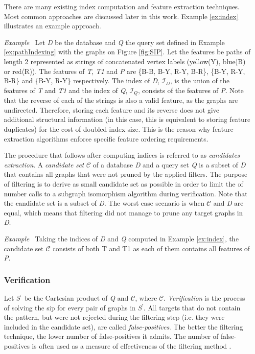 \documentclass{l4proj}
\newcounter{example}[section]
\newenvironment{example}[1][]{\refstepcounter{example}\par\medskip
   \noindent \textit{Example~\theexample #1} \rmfamily}{\medskip}
\newcommand{\fancyI}{\mathcal{I}}
\newcommand{\fancyC}{\mathcal{C}}
\begin{document}
There are many existing index computation and feature extraction techniques. Most common approaches are discussed later in this work. Example \ref{ex:index} illustrates an example approach.

\begin{example}
\label{ex:index}
Let \emph{D} be the database and \emph{Q} the query set defined in Example \ref{ex:pathIndexing} with the graphs on Figure \ref{fig:SIP}. Let the features be paths of length 2 represented as strings of concatenated vertex labels (yellow(Y), blue(B) or red(R)). The features of \emph{T}, \emph{T1} and \emph{P} are \{B-B, B-Y, R-Y, B-R\}, \{B-Y, R-Y, B-R\} and \{B-Y, R-Y\} respectively. The index of \emph{D}, $\fancyI_{D}$, is the union of the features of \emph{T} and \emph{T1} and the index of \emph{Q}, $\fancyI_{Q}$, consists of the features of \emph{P}. Note that the reverse of each of the strings is also a valid feature, as the graphs are undirected. Therefore, storing each feature and its reverse does not give additional structural information (in this case, this is equivalent to storing feature duplicates) for the cost of doubled index size. This is the reason why feature extraction algorithms enforce specific feature ordering requirements.
\end{example}

The procedure that follows after computing indices is referred to as \emph{candidates extraction}. A \emph{candidate set} $\fancyC$ of a database \emph{D} and a query set \emph{Q} is a subset of \emph{D} that contains all graphs that were not pruned by the applied filters. 
The purpose of filtering is to derive as small candidate set as possible in order to limit the of number calls to a subgraph isomorphism algorithm during verification. Note that the candidate set is a subset of \emph{D}. The worst case scenario is when $\fancyC$ and \emph{D} are equal, which means that filtering did not manage to prune any target graphs in \emph{D}.

\begin{example}
Taking the indices of \emph{D} and \emph{Q} computed in Example \ref{ex:index}, the candidate set $\fancyC$ consists of both T and T1 as each of them contains all features of \emph{P}.
\end{example}

\subsubsection{Verification}
Let \emph{S$^\prime$} be the Cartesian product of \emph{Q} and $\fancyC$, where $\fancyC$. \emph{Verification} is the process of solving the \gls{sip} for every pair of graphs in \emph{S$^\prime$}. All targets that do not contain the pattern, but were not rejected during the filtering step (i.e. they were included in the candidate set), are called \emph{false-positives}. The better the filtering technique, the lower number of false-positives it admits. The number of false-positives is often used as a measure of effectiveness of the filtering method \cite{foteini}.
\end{document}
